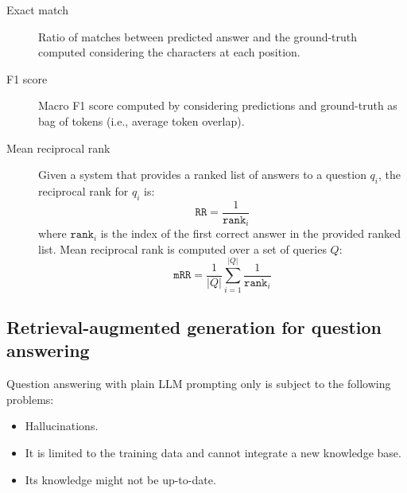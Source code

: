 \begin{description}
    \item[Exact match] 
        Ratio of matches between predicted answer and the ground-truth computed considering the characters at each position.

    \item[F1 score] 
        Macro F1 score computed by considering predictions and ground-truth as bag of tokens (i.e., average token overlap).

    \item[Mean reciprocal rank] 
        Given a system that provides a ranked list of answers to a question $q_i$, the reciprocal rank for $q_i$ is:
        \[ \texttt{RR} = \frac{1}{\texttt{rank}_i} \]
        where $\texttt{rank}_i$ is the index of the first correct answer in the provided ranked list.
        Mean reciprocal rank is computed over a set of queries $Q$:
        \[ \texttt{mRR} = \frac{1}{|Q|} \sum_{i=1}^{|Q|} \frac{1}{\texttt{rank}_i} \]

\end{description}


\subsection{Retrieval-augmented generation for question answering}

\begin{remark}
    Question answering with plain LLM prompting only is subject to the following problems:
    \begin{itemize}
        \item Hallucinations.
        \item It is limited to the training data and cannot integrate a new knowledge base.
        \item Its knowledge might not be up-to-date.
    \end{itemize}
\end{remark}

